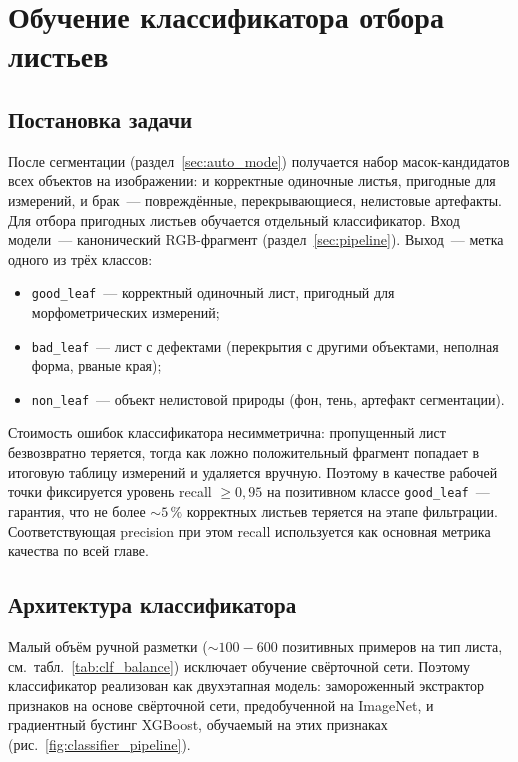 
\section{Обучение классификатора отбора листьев}
\label{sec:classifier_chapter}

\subsection{Постановка задачи}
\label{sec:classifier_task}

После сегментации (раздел~\ref{sec:auto_mode}) получается набор
масок-кандидатов всех объектов на изображении: и корректные одиночные
листья, пригодные для измерений, и брак~--- повреждённые, перекрывающиеся,
нелистовые артефакты. Для отбора пригодных листьев обучается отдельный
классификатор. Вход модели~--- канонический RGB-фрагмент
(раздел~\ref{sec:pipeline}). Выход~--- метка одного из трёх классов:

\begin{itemize}
    \item \texttt{good\_leaf}~--- корректный одиночный лист, пригодный для
          морфометрических измерений;
    \item \texttt{bad\_leaf}~--- лист с дефектами (перекрытия с другими
          объектами, неполная форма, рваные края);
    \item \texttt{non\_leaf}~--- объект нелистовой природы (фон, тень,
          артефакт сегментации).
\end{itemize}

Стоимость ошибок классификатора несимметрична: пропущенный лист
безвозвратно теряется, тогда как ложно положительный фрагмент попадает в
итоговую таблицу измерений и удаляется вручную. Поэтому в качестве рабочей
точки фиксируется уровень recall $\geq 0{,}95$ на позитивном классе
\texttt{good\_leaf}~--- гарантия, что не более $\sim 5\,\%$ корректных
листьев теряется на этапе фильтрации. Соответствующая precision при этом
recall используется как основная метрика качества по всей главе.

\subsection{Архитектура классификатора}
\label{sec:classifier}

Малый объём ручной разметки ($\sim 100\!-\!600$ позитивных примеров на тип
листа, см.\ табл.~\ref{tab:clf_balance}) исключает обучение свёрточной сети.
Поэтому классификатор реализован
как двухэтапная модель: замороженный экстрактор признаков на основе свёрточной
сети, предобученной на ImageNet, и градиентный бустинг XGBoost, обучаемый на
этих признаках (рис.~\ref{fig:classifier_pipeline}).

